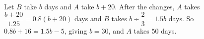 Let $B$ take $b$ days and $A$ take $b+20$. After the changes, $A$ takes $\dfrac{b+20}{1.25}=0.8(b+20)$ days and $B$ takes $b\div\dfrac23=1.5b$ days. So $0.8b+16=1.5b-5$, giving $b=30$, and $A$ takes $\boxed{50}$ days.
